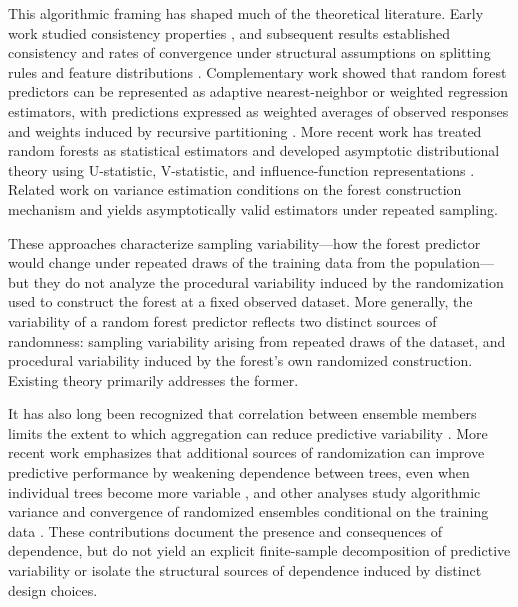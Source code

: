 \documentclass[11pt]{article}
\theoremstyle{plain}
\theoremstyle{definition}
\theoremstyle{remark}
\begin{document}
This algorithmic framing has shaped much of the theoretical literature. Early work studied consistency properties \citep{breiman2004}, and subsequent results established consistency and rates of convergence under structural assumptions on splitting rules and feature distributions \citep{biau2008,biau2012,scornet2015,biau2016}. Complementary work showed that random forest predictors can be represented as adaptive nearest-neighbor or weighted regression estimators, with predictions expressed as weighted averages of observed responses and weights induced by recursive partitioning \citep{lin2006,biau2010,meinshausen2006,athey2019}. More recent work has treated random forests as statistical estimators and developed asymptotic distributional theory using U-statistic, V-statistic, and influence-function representations \citep{mentch2016,zhou2021v,wager2018}. Related work on variance estimation \citep{xu2024variance} conditions on the forest construction mechanism and yields asymptotically valid estimators under repeated sampling.

These approaches characterize sampling variability---how the forest predictor would change under repeated draws of the training data from the population---but they do not analyze the procedural variability induced by the randomization used to construct the forest at a fixed observed dataset. More generally, the variability of a random forest predictor reflects two distinct sources of randomness: sampling variability arising from repeated draws of the dataset, and procedural variability induced by the forest's own randomized construction. Existing theory primarily addresses the former.

It has also long been recognized that correlation between ensemble members limits the extent to which aggregation can reduce predictive variability \citep{breiman1996,dietterich2000,buhlmann2002,kuncheva2003,brown2005}. More recent work emphasizes that additional sources of randomization can improve predictive performance by weakening dependence between trees, even when individual trees become more variable \citep{mentch2020,mentch2022,liu2025}, and other analyses study algorithmic variance and convergence of randomized ensembles conditional on the training data \citep{lopes2020,lopes2019b}. These contributions document the presence and consequences of dependence, but do not yield an explicit finite-sample decomposition of predictive variability or isolate the structural sources of dependence induced by distinct design choices.
\end{document}
